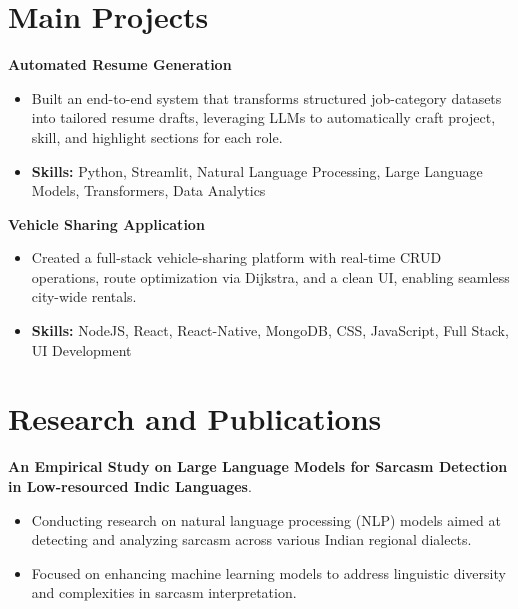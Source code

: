 \documentclass[a4paper,11pt]{article}
\begin{document}
\section{\textbf{Main Projects}}

\vspace{1mm}
  \textbf{Automated Resume Generation  }
\vspace{-1.5mm} %
\begin{itemize}
  \item Built an end-to-end system that transforms structured job-category datasets into tailored resume drafts, leveraging LLMs to automatically craft project, skill, and highlight sections for each role.
\vspace{-3mm}
  \item \textbf{Skills:} Python, Streamlit, Natural Language Processing, Large Language Models, Transformers, Data Analytics
\end{itemize}


\vspace{1mm}
   \textbf{Vehicle Sharing Application }
\vspace{-1.5mm} %
\begin{itemize}
  \item Created a full-stack vehicle-sharing platform with real-time CRUD operations, route optimization via Dijkstra, and a clean UI, enabling seamless city-wide rentals.
\vspace{-3mm}
  \item \textbf{Skills:} NodeJS, React, React-Native, MongoDB, CSS, JavaScript, Full Stack, UI Development
\end{itemize}



\section{\textbf{Research and Publications} \hfill }
\vspace{1mm}
  \textbf{An Empirical Study on Large Language Models for Sarcasm Detection in Low-resourced Indic Languages}.
\vspace{-1mm} %
\begin{itemize}
  \item Conducting research on natural language processing (NLP) models aimed at detecting and analyzing sarcasm across various Indian regional dialects.
\vspace{-3mm}
  \item Focused on enhancing machine learning models to address linguistic diversity and complexities in sarcasm interpretation.
\end{itemize}
\end{document}

